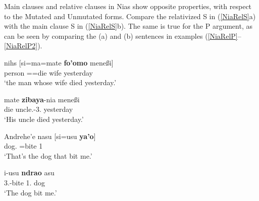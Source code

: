 
Main clauses and relative clauses in Nias show opposite properties, with respect to the Mutated and Unmutated forms.
Compare the relativized S in (\ref{NiaRelS}a) with the main clause S in (\ref{NiaRelS}b). 
The same is true for the P argument, as can be seen by comparing the (a) and (b) sentences in examples (\ref{NiaRelP}--\ref{NiaRelP2}). 

\begin{exe} \ex\label{NiaRelS}
\begin{xlist}
\ex \gll nihs  {\rm[}si=ma=mate \textbf{fo'omo} mene{\ss}i{\rm]}\\
\hspaceThis{[}person \relativ{}=\compl{}=die wife yesterday\\
\glt `the man whose wife died yesterday.'

 \ex \gll mate \textbf{zibaya}-nia mene{\ss}i\\
die uncle.\mut{}-3\sg{}.\poss{} yesterday\\
\glt `His uncle died yesterday.' %
\end{xlist} 
\end{exe}

\begin{exe} \ex\label{NiaRelP}
\begin{xlist} 
\ex \gll Andrehe'e {nasu}     {\rm[}si=usu \textbf{ya'o}{\rm]}\\
         \dist{}   dog.\mut{} \hspaceThis{[}\relativ{}=bite 1\sg{}\\
\glt `That's the dog that bit me.'  %

\ex \gll i-usu \textbf{ndrao} {asu}\\
3\sg{}.\rls{}-bite 1\sg{}.\mut{} dog\\
\glt `The dog bit me.' %
\end{xlist}%
\end{exe} 

